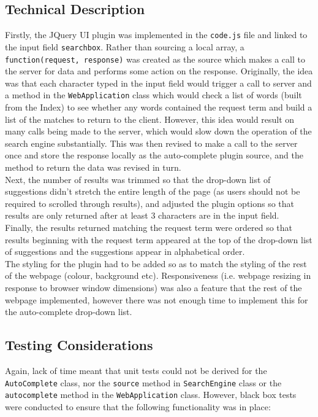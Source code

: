 \subsection{Technical Description}
Firstly, the JQuery UI plugin was implemented in the {\tt code.js} file and linked to the input field {\tt searchbox}.
Rather than sourcing a local array, a {\tt function(request, response)} was created as the source which makes a call to the server for data and performs some action on the response.
Originally, the idea was that each character typed in the input field would trigger a call to server and a method in the {\tt WebApplication} class which would check a list of words (built from the Index) to see whether any words contained the request term and build a list of the matches to return to the client.
However, this idea would result on many calls being made to the server, which would slow down the operation of the search engine substantially. This was then revised to make a call to the server once and store the response locally as the auto-complete plugin source, and the method to return the data was revised in turn.
\\
Next, the number of results was trimmed so that the drop-down list of suggestions didn't stretch the entire length of the page (as users should not be required to scrolled through results), and adjusted the plugin options so that results are only returned after at least 3 characters are in the input field.
\\
Finally, the results returned matching the request term were ordered so that results beginning with the request term appeared at the top of the drop-down list of suggestions and the suggestions appear in alphabetical order.
\\
The styling for the plugin had to be added so as to match the styling of the rest of the webpage (colour, background etc). Responsiveness (i.e. webpage resizing in response to browser window dimensions) was also a feature that the rest of the webpage implemented, however there was not enough time to implement this for the auto-complete drop-down list.

\subsection{Testing Considerations}
Again, lack of time meant that unit tests could not be derived for the {\tt AutoComplete} class, nor the {\tt source} method in {\tt SearchEngine} class or the {\tt autocomplete} method in the {\tt WebApplication} class. However, black box tests were conducted to ensure that the following functionality was in place:

